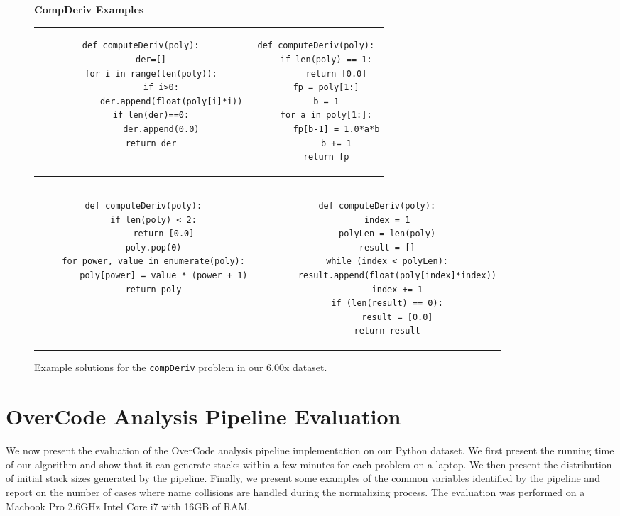 \documentclass[12pt,twoside]{mitthesis}
\newcommand \codevar[1]{\texttt{#1}}
\begin{document}
\begin{figure}
{\bf CompDeriv Examples}\\
\begin{tabular}{cc} 
\begin{minipage}{0.5\linewidth}
\begin{lstlisting}[]
def computeDeriv(poly):
    der=[]
    for i in range(len(poly)):
        if i>0:
            der.append(float(poly[i]*i))
    if len(der)==0:
        der.append(0.0)
    return der

\end{lstlisting}
\end{minipage}
&
\begin{minipage}{0.5\linewidth}
\begin{lstlisting}[]
def computeDeriv(poly):
    if len(poly) == 1:
        return [0.0]
    fp = poly[1:]
    b = 1
    for a in poly[1:]:
        fp[b-1] = 1.0*a*b
        b += 1
    return fp
\end{lstlisting}
\end{minipage}
\\
\end{tabular}
\begin{tabular}{c c}
\begin{minipage}{0.4\linewidth}
\begin{lstlisting}[]
def computeDeriv(poly):
    if len(poly) < 2:
        return [0.0]
    poly.pop(0)
    for power, value in enumerate(poly):
        poly[power] = value * (power + 1)
    return poly
\end{lstlisting}
\end{minipage}
&
\begin{minipage}{0.4\linewidth}
\begin{lstlisting}[]
def computeDeriv(poly):
    index = 1
    polyLen = len(poly)
    result = []
    while (index < polyLen):
        result.append(float(poly[index]*index))
        index += 1
    if (len(result) == 0):
        result = [0.0]
    return result
\end{lstlisting}
\end{minipage}

\end{tabular}
\caption{Example solutions for the \codevar{compDeriv} problem in our 6.00x dataset.}
\label{cdexamples}
\end{figure}


\section{OverCode Analysis Pipeline Evaluation}
We now present the evaluation of the OverCode analysis pipeline implementation on our Python dataset. We first present the running time of our algorithm and show that it can generate stacks within a few minutes for each problem on a laptop. We then present the distribution of initial stack sizes generated by the pipeline. Finally, we present some examples of the common variables identified by the pipeline and report on the number of cases where name collisions are handled during the normalizing process. The evaluation was performed on a Macbook Pro 2.6GHz Intel Core i7 with 16GB of RAM. %
\end{document}

